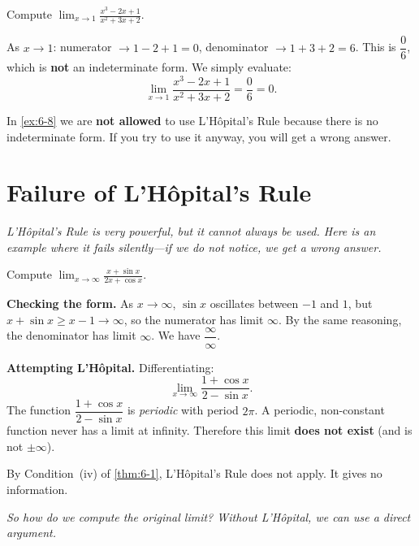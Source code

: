 \begin{example}
\label{ex:6-8}
Compute $\displaystyle\lim_{x \to 1}\frac{x^{3} - 2x + 1}{x^{2} + 3x + 2}$.

As $x \to 1$: numerator $\to 1 - 2 + 1 = 0$, denominator $\to 1 + 3 + 2 = 6$.  This is $\dfrac{0}{6}$, which is \textbf{not} an indeterminate form.  We simply evaluate:
\[
  \lim_{x \to 1}\frac{x^{3} - 2x + 1}{x^{2} + 3x + 2} = \frac{0}{6} = 0.
\]
\end{example}

\begin{remark}[Warning]
In \cref{ex:6-8} we are \textbf{not allowed} to use L'H\^opital's Rule because there is no indeterminate form.  If you try to use it anyway, you will get a wrong answer.
\end{remark}

\section{Failure of L'H\^opital's Rule}
\label{sec:6.8}

\textit{L'H\^opital's Rule is very powerful, but it cannot always be used.  Here is an example where it fails silently---if we do not notice, we get a wrong answer.}

\begin{example}
\label{ex:6-9}
Compute $\displaystyle\lim_{x \to \infty}\frac{x + \sin x}{2x + \cos x}$.

\textbf{Checking the form.}  As $x \to \infty$, $\sin x$ oscillates between $-1$ and $1$, but $x + \sin x \geq x - 1 \to \infty$, so the numerator has limit $\infty$.  By the same reasoning, the denominator has limit $\infty$.  We have $\dfrac{\infty}{\infty}$.

\textbf{Attempting L'H\^opital.}  Differentiating:
\[
  \lim_{x \to \infty}\frac{1 + \cos x}{2 - \sin x}.
\]
The function $\dfrac{1 + \cos x}{2 - \sin x}$ is \emph{periodic} with period $2\pi$.  A periodic, non-constant function never has a limit at infinity.  Therefore this limit \textbf{does not exist} (and is not $\pm\infty$).

By Condition~(iv) of \cref{thm:6-1}, L'H\^opital's Rule does not apply.  It gives no information.
\end{example}

\textit{So how do we compute the original limit?  Without L'H\^opital, we can use a direct argument.}

